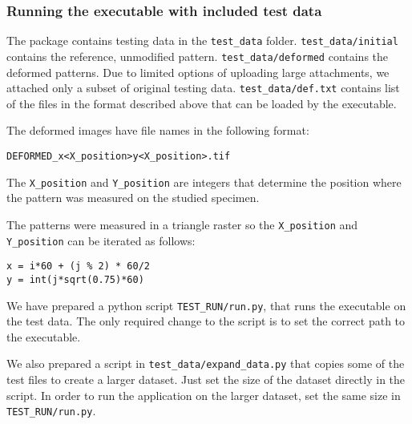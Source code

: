 \subsubsection*{Running the executable with included test data}

The package contains testing data in the \texttt{test\_data} folder. \texttt{test\_data/initial} contains the reference, unmodified pattern. \texttt{test\_data/deformed} contains the deformed patterns. Due to limited options of uploading large attachments, we attached only a subset of original testing data. \texttt{test\_data/def.txt} contains list of the files in the format described above that can be loaded by the executable.

\vspace{0.3cm}
\noindent
The deformed images have file names in the following format:
\begin{verbatim}
DEFORMED_x<X_position>y<X_position>.tif
\end{verbatim}
The \texttt{X\_position} and \texttt{Y\_position} are integers that determine the position where the pattern was measured on the studied specimen.

\vspace{0.3cm}
\noindent
The patterns were measured in a triangle raster so the \texttt{X\_position} and \texttt{Y\_position} can be iterated as follows:
\begin{verbatim}
x = i*60 + (j % 2) * 60/2
y = int(j*sqrt(0.75)*60)
\end{verbatim}
We have prepared a python script \texttt{TEST\_RUN/run.py}, that runs the executable on the test data. The only required change to the script is to set the correct path to the executable.

We also prepared a script in \texttt{test\_data/expand\_data.py} that copies some of the test files to create a larger dataset. Just set the size of the dataset directly in the script. In order to run the application on the larger dataset, set the same size in \texttt{TEST\_RUN/run.py}.